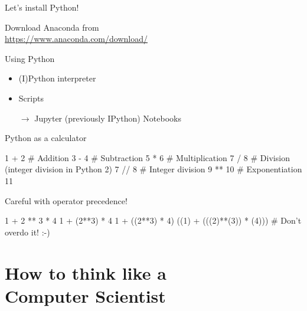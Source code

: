 \begin{frame}{Let's install Python!}
    \begin{center}
        \Large%
        Download Anaconda from \\[\medskipamount]
        \url{https://www.anaconda.com/download/}
    \end{center}
\end{frame}

\begin{frame}{Using Python}
    \begin{itemize}
        \setlength{\itemsep}{0.75em}
        \item (I)Python interpreter
        \item Scripts
        \item[$\rightarrow$] Jupyter (previously IPython) Notebooks
    \end{itemize}
\end{frame}

\begin{frame}[fragile]{Python as a calculator}
    \begin{py3}
        1 + 2    # Addition
        3 - 4    # Subtraction
        5 * 6    # Multiplication
        7 / 8    # Division (integer division in Python 2)
        7 // 8   # Integer division
        9 ** 10  # Exponentiation
        11 %
    \end{py3}
\end{frame}

\begin{frame}[fragile]{Careful with operator precedence!}
    \begin{py3}
        1 + 2 ** 3 * 4
        1 + (2**3) * 4
        1 + ((2**3) * 4)
        ((1) + (((2)**(3)) * (4)))  # Don't overdo it! :-)
    \end{py3}
\end{frame}

\section{How to think like a \\ Computer Scientist}

